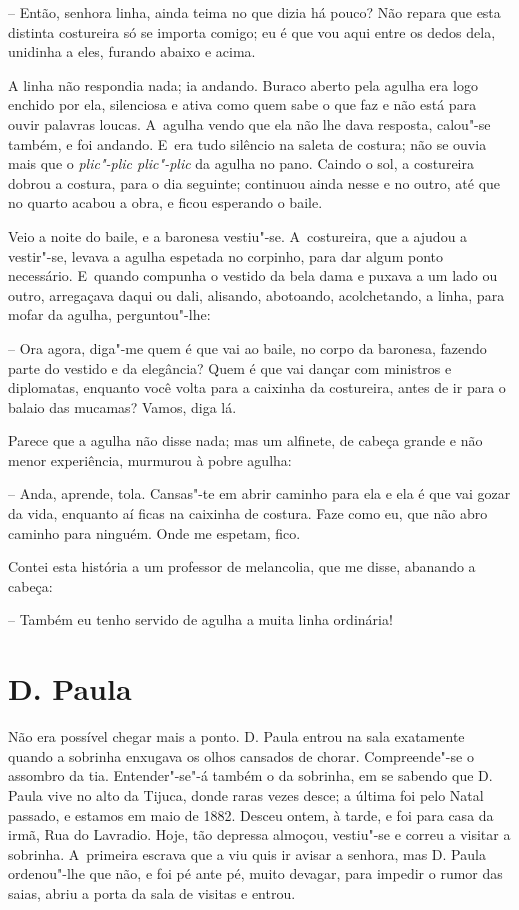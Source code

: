 -- Então, senhora linha, ainda teima no que dizia há pouco? Não repara
que esta distinta costureira só se importa comigo; eu é que vou aqui
entre os dedos dela, unidinha a eles, furando abaixo e acima.

A linha não respondia nada; ia andando. Buraco aberto pela agulha era
logo enchido por ela, silenciosa e ativa como quem sabe o que faz e não
está para ouvir palavras loucas. A~agulha vendo que ela não lhe dava
resposta, calou"-se também, e foi andando. E~era tudo silêncio na saleta
de costura; não se ouvia mais que o \emph{plic"-plic plic"-plic} da agulha
no pano. Caindo o sol, a costureira dobrou a costura, para o dia
seguinte; continuou ainda nesse e no outro, até que no quarto acabou a
obra, e ficou esperando o baile.

Veio a noite do baile, e a baronesa vestiu"-se. A~costureira, que a
ajudou a vestir"-se, levava a agulha espetada no corpinho, para dar algum
ponto necessário. E~quando compunha o vestido da bela dama e puxava a um
lado ou outro, arregaçava daqui ou dali, alisando, abotoando,
acolchetando, a linha, para mofar da agulha, perguntou"-lhe:

-- Ora agora, diga"-me quem é que vai ao baile, no corpo da baronesa,
fazendo parte do vestido e da elegância? Quem é que vai dançar com
ministros e diplomatas, enquanto você volta para a caixinha da
costureira, antes de ir para o balaio das mucamas? Vamos, diga lá.

Parece que a agulha não disse nada; mas um alfinete, de cabeça grande e
não menor experiência, murmurou à pobre agulha:

-- Anda, aprende, tola. Cansas"-te em abrir caminho para ela e ela é que
vai gozar da vida, enquanto aí ficas na caixinha de costura. Faze como
eu, que não abro caminho para ninguém. Onde me espetam, fico.

Contei esta história a um professor de melancolia, que me disse,
abanando a cabeça:

-- Também eu tenho servido de agulha a muita linha ordinária!

\chapter{D. Paula}

Não era possível chegar mais a ponto. D. Paula entrou na sala exatamente
quando a sobrinha enxugava os olhos cansados de chorar. Compreende"-se o
assombro da tia. Entender"-se"-á também o da sobrinha, em se sabendo que
D. Paula vive no alto da Tijuca, donde raras vezes desce; a última foi
pelo Natal passado, e estamos em maio de 1882. Desceu ontem, à tarde, e
foi para casa da irmã, Rua do Lavradio. Hoje, tão depressa almoçou,
vestiu"-se e correu a visitar a sobrinha. A~primeira escrava que a viu
quis ir avisar a senhora, mas D. Paula ordenou"-lhe que não, e foi pé
ante pé, muito devagar, para impedir o rumor das saias, abriu a porta da
sala de visitas e entrou.

